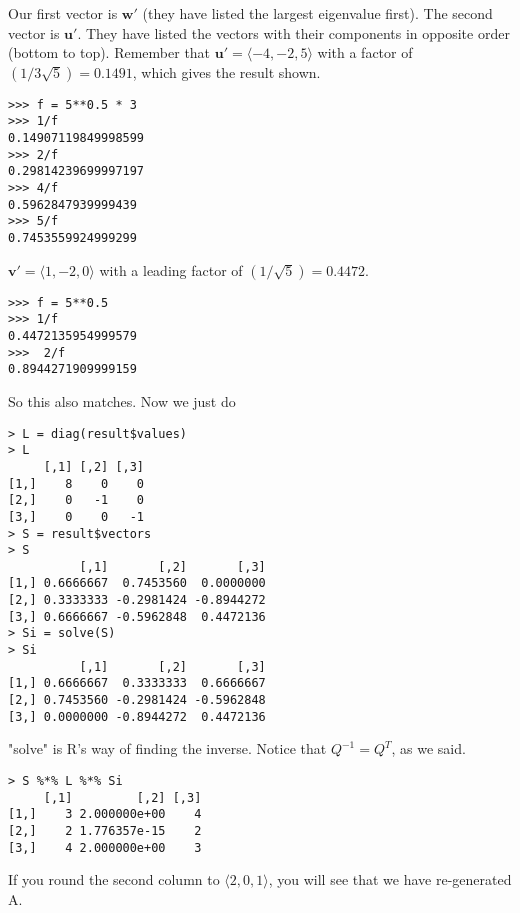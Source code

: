 \documentclass[11pt, oneside]{article}
\begin{document}
Our first vector is $\mathbf{w'}$ (they have listed the largest eigenvalue first).  The second vector is $\mathbf{u'}$.  They have listed the vectors with their components in opposite order (bottom to top).  Remember that $\mathbf{u'}= \langle -4,-2,5 \rangle $ with a factor of $(1/3\sqrt{5}) = 0.1491$, which gives the result shown.

\begin{verbatim}
>>> f = 5**0.5 * 3
>>> 1/f
0.14907119849998599
>>> 2/f
0.29814239699997197
>>> 4/f
0.5962847939999439
>>> 5/f
0.7453559924999299
\end{verbatim}

$\mathbf{v'}= \langle 1,-2,0 \rangle $ with a leading factor of $(1/\sqrt{5}) = 0.4472$.

\begin{verbatim}
>>> f = 5**0.5
>>> 1/f
0.4472135954999579
>>>  2/f
0.8944271909999159
\end{verbatim}

So this also matches.  Now we just do

\begin{verbatim}
> L = diag(result$values)
> L
     [,1] [,2] [,3]
[1,]    8    0    0
[2,]    0   -1    0
[3,]    0    0   -1
> S = result$vectors
> S
          [,1]       [,2]       [,3]
[1,] 0.6666667  0.7453560  0.0000000
[2,] 0.3333333 -0.2981424 -0.8944272
[3,] 0.6666667 -0.5962848  0.4472136
> Si = solve(S)
> Si
          [,1]       [,2]       [,3]
[1,] 0.6666667  0.3333333  0.6666667
[2,] 0.7453560 -0.2981424 -0.5962848
[3,] 0.0000000 -0.8944272  0.4472136
\end{verbatim}

"solve" is R's way of finding the inverse.  Notice that $Q^{-1} = Q^T$, as we said.
\begin{verbatim}
> S %*% L %*% Si
     [,1]         [,2] [,3]
[1,]    3 2.000000e+00    4
[2,]    2 1.776357e-15    2
[3,]    4 2.000000e+00    3
\end{verbatim}

If you round the second column to $ \langle 2,0,1 \rangle $, you will see that we have re-generated A.
\end{document}
